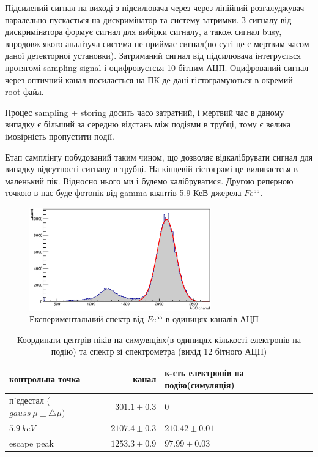 \documentclass[pdftex,14pt]{scrartcl}
\begin{document}
\begin{spacing}{1.5}
	Підсилений сигнал на виході з підсилювача через через лінійний розгалуджувач  паралельно пускається на дискримінатор та систему затримки. З сигналу від дискримінатора формує сигнал для вибірки сигналу, а також сигнал busy, впродовж якого аналізуча система не приймає сигнал(по суті це є мертвим часом даної детекторної установки). Затриманий сигнал від підсилювача інтегрується протягомі sampling signal і оцифровуєтсья 10 бітним АЦП. Оцифрований сигнал через оптичний канал посилається на ПК де дані гістограмуються в окремий root-файл.
	
	Процес sampling + storing досить часо затратний, і мертвий час в даному випадку є більший за середню відстань між подіями в трубці, тому є велика імовірність пропустити події.
	
	Етап самплінгу побудований таким чином, що дозволяє відкалібрувати сигнал для випадку відсутності сигналу в трубці. На кінцевій гістограмі це виливаєтсья в маленький пік. Відносно нього ми і будемо калібруватися. Другою реперною точкою в нас буде фотопік від gamma квантів 5.9 КеВ джерела $Fe^{55}$.
	
	\begin{figure}
	\centering
	\includegraphics[width=0.7\textwidth]{expFitted1750}
	\caption{ Експериментальний спектр від $Fe^{55}$ в одиницях каналів АЦП}
	\label{fig:expFitted1750}
	\end{figure}
	
	\begin{table}[!h]
	\centering
	\begin{tabular}{|l|r|l|}
		\hline
		контрольна точка & канал & к-сть електронів на подію(симуляція) \\
		\hline
		п'єдестал ($gauss~\mu \pm \bigtriangleup \mu)$ & $301.1 \pm 0.3 $ & 0\\
		\hline
		$5.9~keV$ & $2107.4 \pm 0.3$ & $210.42 \pm 0.01$ \\ 
		\hline
		escape peak & $1253.3 \pm 0.9 $ & $97.99 \pm 0.03$ \\
		\hline
	\end{tabular}
	\caption{ Координати центрів піків на симуляціях(в одиницях кількості електронів на подію) та спектр зі спектрометра (вихід 12 бітного АЦП)}
	\label{table:peakPos}
	\end{table}
	

\end{spacing}
\end{document}
